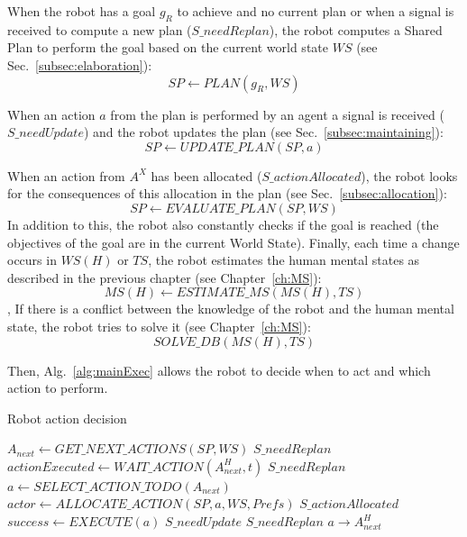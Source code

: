 \documentclass[english,a4paper,11pt,twoside]{StyleThese}
\begin{document}
When the robot has a goal $g_R$ to achieve and no current plan or when a signal is received to compute a new plan ($S\_needReplan$), the robot computes a Shared Plan to perform the goal based on the current world state $WS$ (see Sec.~\ref{subsec:elaboration}):
$$SP \leftarrow PLAN(g_R, WS)$$

When an action $a$ from the plan is performed by an agent a signal is received ($S\_needUpdate$) and the robot updates the plan (see Sec.~\ref{subsec:maintaining}):
$$SP \leftarrow UPDATE\_PLAN(SP, a)$$

When an action from $A^X$ has been allocated ($S\_actionAllocated$), the robot looks for the consequences of this allocation in the plan (see Sec.~\ref{subsec:allocation}):
$$SP \leftarrow EVALUATE\_ PLAN(SP, WS)$$
In addition to this, the robot also constantly checks if the goal is reached (the objectives of the goal are in the current World State).
Finally, each time a change occurs in $WS(H)$ or $TS$, the robot estimates the human mental states as described in the previous chapter (see Chapter~\ref{ch:MS}):
$$MS(H) \leftarrow ESTIMATE\_MS(MS(H), TS)$$,
If there is a conflict between the knowledge of the robot and the human mental state, the robot tries to solve it (see Chapter~\ref{ch:MS}): 
$$SOLVE\_DB(MS(H), TS)$$

Then, Alg.~\ref{alg:mainExec} allows the robot to decide when to act and which action to perform. 

\begin{algorithm}
\caption{Robot action decision}
\label{alg:mainExec}
\begin{algorithmic}
\STATE $A_{next} \leftarrow GET\_NEXT\_ACTIONS(SP, WS)$
\STATE $S\_needReplan$
\STATE $actionExecuted \leftarrow WAIT\_ACTION(A^H_{next}, t)$
\STATE $S\_needReplan$
\ENDIF 
\ELSE
\STATE $a \leftarrow SELECT\_ACTION\_TODO(A_{next})$
\STATE $actor \leftarrow ALLOCATE\_ACTION(SP, a, WS, Prefs)$
\STATE $S\_actionAllocated$
\ENDIF
{}
\STATE $success \leftarrow EXECUTE(a)$
\STATE $S\_needUpdate$
\ELSE 
\STATE $S\_needReplan$
\ENDIF
{}
\STATE $a \rightarrow A^H_{next}$
\ENDIF
\ENDIF
\ENDWHILE
\end{algorithmic}
\end{algorithm} 
\end{document}

